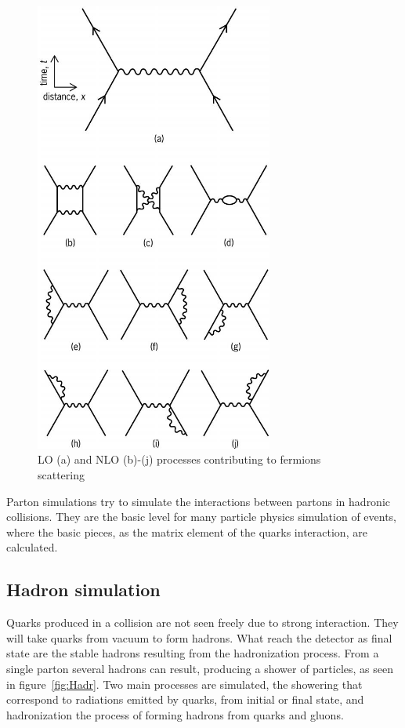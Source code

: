 \begin{figure}[!Hhtbp]
  \begin{center}
    \includegraphics[width=0.7\textwidth]{figs/Feynman_diagrams.jpg}
    \caption{LO (a) and NLO (b)-(j) processes contributing to fermions scattering}
    \label{fig:LOpNLO}
  \end{center}
\end{figure}

Parton simulations try to simulate the interactions between partons in hadronic collisions. They are the basic level for many particle physics simulation of events, where the basic pieces, as the matrix element of the quarks interaction, are calculated.

\subsection{Hadron simulation}
\label{sec:hadron}

Quarks produced in a collision are not seen freely due to strong interaction. They will take quarks from vacuum to form hadrons. What reach the detector as final state are the stable hadrons resulting from the hadronization process. From a single parton several hadrons can result, producing a shower of particles, as seen in figure~\ref{fig:Hadr}. Two main processes are simulated, the showering that correspond to radiations emitted by quarks, from initial or final state, and hadronization the process of forming hadrons from quarks and gluons. 

